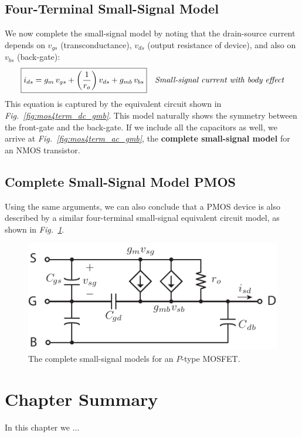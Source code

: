 \subsection{Four-Terminal Small-Signal Model}
We now complete the small-signal model by noting that the drain-source current depends on $v_{gs}$ (transconductance), $v_{ds}$ (output resistance of device), and also on $v_{bs}$ (back-gate):
    \begin{align}
        \Aboxed{i_{ds} &= g_m\,v_{gs} + \left( \frac{1}{r_o} \right)v_{ds} + g_{mb}\,v_{bs}} &\textit{Small-signal current with body effect}
    \end{align}
This equation is captured by the equivalent circuit shown in \emph{Fig.~\ref{fig:mos4term_dc_gmb}}.  This model naturally shows the symmetry between the front-gate and the back-gate.  If we include all the capacitors as well, we arrive at \emph{Fig.~\ref{fig:mos4term_ac_gmb}}, the \textbf{complete small-signal model} for an NMOS transistor.
\subsection{Complete Small-Signal Model PMOS}
Using the same arguments, we can also conclude that a PMOS device is also described by a similar four-terminal small-signal equivalent circuit model, as shown in \emph{Fig.~\ref{fig:pmos4term_ac}}.
\begin{figure}[h]
\centering
\includegraphics[scale=1.05]{pmos4term_ac}
\caption{The complete small-signal models for an $P$-type MOSFET.}
\label{fig:pmos4term_ac}
\end{figure}
\newpage
\section{Chapter Summary}
In this chapter we ...
